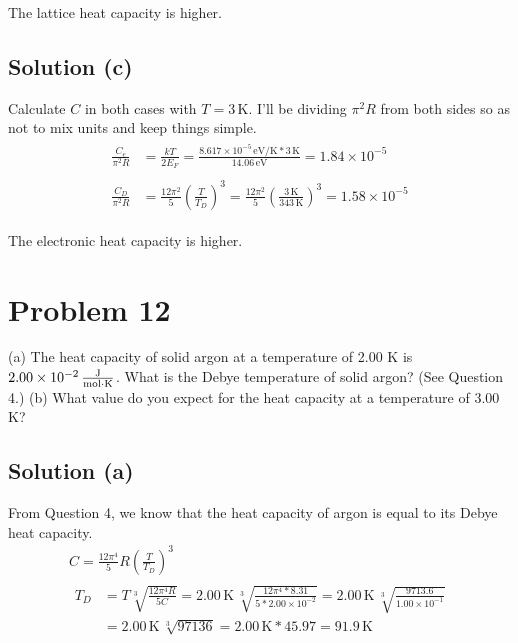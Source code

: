 \documentclass[12pt]{article}
\newcommand{\E}[1]{\times 10^{#1}}
\begin{document}
        The lattice heat capacity is higher.

    \subsection{Solution (c)}
        Calculate $C$ in both cases with $T = 3\,\unit{\kelvin}$.
        I'll be dividing $\pi^2 R$ from both sides so as not to mix units and keep things simple.
        \begin{gather}
            \begin{align}
                \frac{C_e}{\pi^2 R} &=  \frac{k T}{2 E_F}
                    =   \frac{8.617\E{-5}\,\unit{\eV/\kelvin} * 3\,\unit{\kelvin}}{14.06\,\unit{\eV}}
                    =   1.84\E{-5}
            \end{align}\\
            \begin{align}
                \frac{C_D}{\pi^2 R} &=  \frac{12\pi^2}{5}\left( \frac{T}{T_D} \right)^3
                    =   \frac{12\pi^2}{5}\left( \frac{3\,\unit{\kelvin}}{343\,\unit{\kelvin}} \right)^3
                    =   1.58\E{-5}
            \end{align}
        \end{gather}

        The electronic heat capacity is higher.

\section{Problem 12}
    (a) The heat capacity of solid argon at a temperature of 2.00 K is $2.00\E{-2}\,\unit{\frac{\joule}{\mole\cdot\kelvin}}$. 
    What is the Debye temperature of solid argon? (See Question 4.) 
    (b) What value do you expect for the heat capacity at a temperature of 3.00 K?

    \subsection{Solution (a)}
        From Question 4, we know that the heat capacity of argon is equal to its Debye heat capacity.
        \begin{gather}
            C   =   \frac{12\pi^4}{5}R\left( \frac{T}{T_D} \right)^3\\
            \begin{align}
                T_D &=  T\sqrt[3]{\frac{12\pi^4 R}{5 C}}
                    =   2.00\,\unit{\kelvin}\,\sqrt[3]{\frac{12\pi^4 * 8.31}{5 * 2.00\E{-2}}}
                    =   2.00\,\unit{\kelvin}\,\sqrt[3]{\frac{9713.6}{1.00\E{-1}}}\\
                    &=  2.00\,\unit{\kelvin}\,\sqrt[3]{97136}
                    =   2.00\,\unit{\kelvin} * 45.97
                    =   \boxed{91.9\,\unit{\kelvin}}
            \end{align}
        \end{gather}
\end{document}
